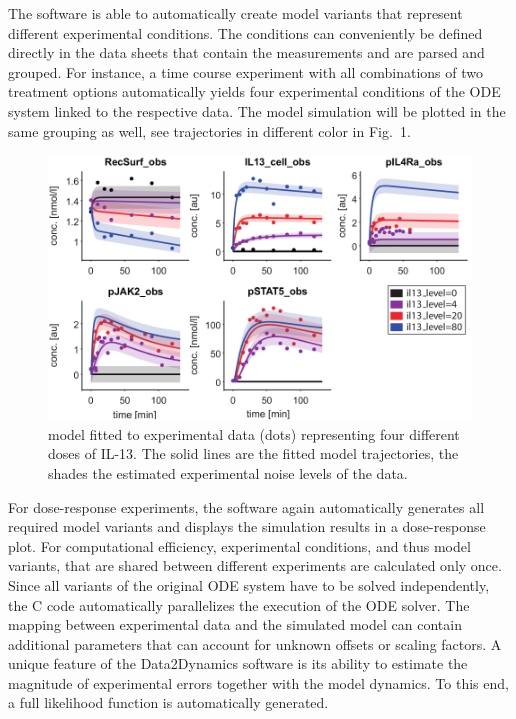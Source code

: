 \documentclass{bioinfo}
\begin{document}
The software is able to automatically create model variants that 
represent different experimental conditions. The conditions can conveniently be defined directly in 
the data sheets that contain the measurements and are parsed and 
grouped. For instance, a time course experiment with all combinations of two treatment 
options automatically yields four experimental conditions of the ODE system linked to the 
respective data. The model simulation will be plotted in the same grouping as well, see 
trajectories in different color in Fig.~1. 
\begin{figure}[!tpb]
\centerline{\includegraphics[width=\linewidth]{Figure_D2D_AppNote_v2a.pdf}}
\caption{\citet{Raia:2011vn} model fitted to experimental data (dots) representing four 
different doses of IL-13. The solid lines are the fitted model trajectories, the shades 
the estimated experimental noise levels of the data.}\label{fig:01}
\end{figure}
For dose-response experiments, the software again automatically generates all required 
model variants and displays the simulation results in a dose-response plot. For 
computational efficiency, experimental conditions, and thus model variants, that are 
shared between different experiments are calculated only once. Since all variants of the 
original ODE system have to be solved independently, the C code automatically 
parallelizes the execution of the ODE solver. The mapping between experimental data 
and the simulated model can contain additional parameters that can account for 
unknown offsets or scaling factors. A unique feature of the Data2Dynamics software is its 
ability to estimate the magnitude of experimental errors together with the model 
dynamics. To this end, a full likelihood function is automatically generated.
\end{document}
